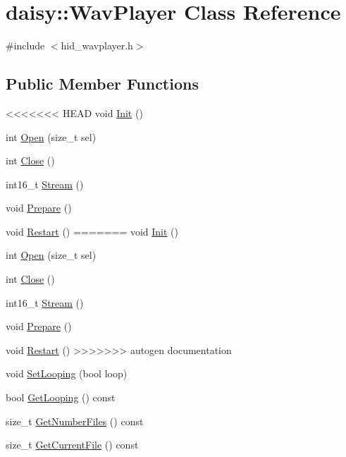 \hypertarget{classdaisy_1_1_wav_player}{}\section{daisy\+:\+:Wav\+Player Class Reference}
\label{classdaisy_1_1_wav_player}


{\ttfamily \#include $<$hid\+\_\+wavplayer.\+h$>$}

\subsection*{Public Member Functions}
\begin{DoxyCompactItemize}
\item 
<<<<<<< HEAD
void \hyperlink{classdaisy_1_1_wav_player_a37026485a3d2aebfd05460771d056605}{Init} ()
\item 
int \hyperlink{classdaisy_1_1_wav_player_ab125d0c6fb01b45443b57df96255efb9}{Open} (size\+\_\+t sel)
\item 
int \hyperlink{classdaisy_1_1_wav_player_adc0c84ee0ecc56e734908a8c1384c5c2}{Close} ()
\item 
int16\+\_\+t \hyperlink{classdaisy_1_1_wav_player_a52be0ed680b908241ffc287f879c6c7a}{Stream} ()
\item 
void \hyperlink{classdaisy_1_1_wav_player_a1126bb632eb141d2979c25cedde354cd}{Prepare} ()
\item 
void \hyperlink{classdaisy_1_1_wav_player_ac3b2f9f9cdf18ea861be227dcffd5da9}{Restart} ()
=======
void \hyperlink{classdaisy_1_1_wav_player_aeb6f0125716b4e8eb7268c8960cc1026}{Init} ()
\item 
int \hyperlink{classdaisy_1_1_wav_player_aa1161ed7b1e16a869d4b5dee293bead6}{Open} (size\+\_\+t sel)
\item 
int \hyperlink{classdaisy_1_1_wav_player_a97d6bb179d9688d747115a29338c6e03}{Close} ()
\item 
int16\+\_\+t \hyperlink{classdaisy_1_1_wav_player_ad0287f6c4be39aead3f7061c0c2b9174}{Stream} ()
\item 
void \hyperlink{classdaisy_1_1_wav_player_adafd33db85b1ded4299d173f2abba06e}{Prepare} ()
\item 
void \hyperlink{classdaisy_1_1_wav_player_ad2f5ebf3afe73de518fd9d3853672261}{Restart} ()
>>>>>>> autogen documentation
\item 
void \hyperlink{classdaisy_1_1_wav_player_a29d340360f073bd1767e51a06876eafe}{Set\+Looping} (bool loop)
\item 
bool \hyperlink{classdaisy_1_1_wav_player_ab4a32e794f0cdc07adab9204fc5c8a80}{Get\+Looping} () const
\item 
size\+\_\+t \hyperlink{classdaisy_1_1_wav_player_affa30de9a51750132f935a2421f17d75}{Get\+Number\+Files} () const
\item 
size\+\_\+t \hyperlink{classdaisy_1_1_wav_player_a3c49d490da98fe5280947dc7889866c1}{Get\+Current\+File} () const
\end{DoxyCompactItemize}


